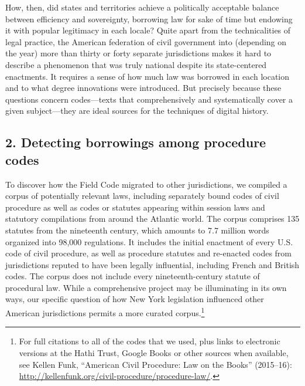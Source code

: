 \documentclass[12pt,]{article}
\let\rmarkdownfootnote\footnote%
\def\footnote{\protect\rmarkdownfootnote}
\begin{document}
How, then, did states and territories achieve a politically acceptable
balance between efficiency and sovereignty, borrowing law for sake of
time but endowing it with popular legitimacy in each locale? Quite apart
from the technicalities of legal practice, the American federation of
civil government into (depending on the year) more than thirty or forty
separate jurisdictions makes it hard to describe a phenomenon that was
truly national despite its state-centered enactments. It requires a
sense of how much law was borrowed in each location and to what degree
innovations were introduced. But precisely because these questions
concern codes---texts that comprehensively and systematically cover a
given subject---they are ideal sources for the techniques of digital
history.

\hypertarget{detecting-borrowings-among-procedure-codes}{%
\subsection{2. Detecting borrowings among procedure
codes}\label{detecting-borrowings-among-procedure-codes}}

To discover how the Field Code migrated to other jurisdictions, we
compiled a corpus of potentially relevant laws, including separately
bound codes of civil procedure as well as codes or statutes appearing
within session laws and statutory compilations from around the Atlantic
world. The corpus comprises 135 statutes from the nineteenth century,
which amounts to 7.7 million words organized into 98,000 regulations. It
includes the initial enactment of every U.S. code of civil procedure, as
well as procedure statutes and re-enacted codes from jurisdictions
reputed to have been legally influential, including French and British
codes. The corpus does not include every nineteenth-century statute of
procedural law. While a comprehensive project may be illuminating in its
own ways, our specific question of how New York legislation influenced
other American jurisdictions permits a more curated corpus.\footnote{For
  full citations to all of the codes that we used, plus links to
  electronic versions at the Hathi Trust, Google Books or other sources
  when available, see Kellen Funk, ``American Civil Procedure: Law on
  the Books'' (2015--16):
  \url{http://kellenfunk.org/civil-procedure/procedure-law/}.}
\end{document}

